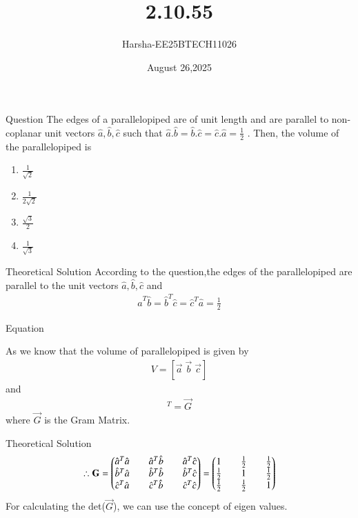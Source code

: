 \documentclass{beamer}
\title %
{2.10.55}
\date{August 26,2025}
\author %
{Harsha-EE25BTECH11026}
\begin{document}
\frame{\titlepage}
\begin{frame}{Question}
The edges of a parallelopiped are of unit length and are parallel to non-coplanar unit vectors $\hat{a},\hat{b},\hat{c}$ such that $\hat{a}.\hat{b}=\hat{b}.\hat{c}=\hat{c}.\hat{a}=\frac{1}{2}$ . Then, the volume of the parallelopiped is

\begin{enumerate}
    \item $\frac{1}{\sqrt{2}}$
    \item $\frac{1}{2\sqrt{2}}$
    \item $\frac{\sqrt{3}}{2}$
    \item $\frac{1}{\sqrt{3}}$
\end{enumerate}
\end{frame}



\begin{frame}{Theoretical Solution}
According to the question,the edges of the parallelopiped are parallel to the unit vectors $\hat{a},\hat{b},\hat{c}$ and\\
\begin{align*}
    \hat{a}^T\hat{b}=\hat{b}^T\hat{c}=\hat{c}^T\hat{a}=\frac{1}{2}
\end{align*}
\end{frame}

\begin{frame}{Equation}

As we know that the volume of parallelopiped is given by
\begin{align*}
    V=[\vec{a}\;\vec{b}\;\vec{c}]
\end{align*}
and
\begin{align*}
    [\vec{a}\;\vec{b}\;\vec{c}][\vec{a}\;\vec{b}\;\vec{c}]^T=\vec{G}
\end{align*}
where $\vec{G}$ is the Gram Matrix.
\end{frame}

\begin{frame}{Theoretical Solution}
\begin{align*}
    \therefore \mathbf{G}=\begin{pmatrix}\hat{a}^T\hat{a}&&\hat{a}^T\hat{b}&&\hat{a}^T\hat{c} \\ \hat{b}^T\hat{a}&& \hat{b}^T\hat{b}&& \hat{b}^T\hat{c} \\ \hat{c}^T\hat{a}&& \hat{c}^T\hat{b}&& \hat{c}^T\hat{c}\end{pmatrix}=\begin{pmatrix}1&&\frac{1}{2}&&\frac{1}{2}\\ \frac{1}{2}&&1&&\frac{1}{2}\\ \frac{1}{2}&&\frac{1}{2}&&1\end{pmatrix}
\end{align*}
For calculating the det($\vec{G}$), we can use the concept of eigen values.
\end{frame}
\end{document}
